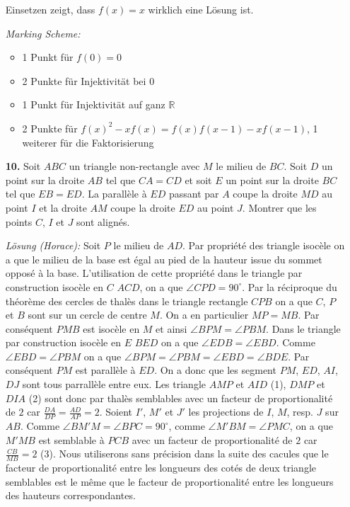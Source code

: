 \documentclass[language=german,style=solution]{smo}
\begin{document}
\begin{enumerate}
Einsetzen zeigt, dass $f(x) = x$ wirklich eine Lösung ist.

\textit{Marking Scheme:}
\begin{itemize}
	\item 1 Punkt für $f(0) = 0$
	\item 2 Punkte für Injektivität bei $0$
	\item 1 Punkt für Injektivität auf ganz $\mathbb{R}$
	\item 2 Punkte für $f(x)^2 - xf(x) = f(x)f(x - 1) - xf(x-1)$, 1 weiterer für die Faktorisierung
\end{itemize}

\newpage

\item[\textbf{10.}] %
Soit $ABC$ un triangle non-rectangle avec $M$ le milieu de $BC$. Soit $D$ un point sur la droite $AB$ tel que $CA=CD$ et soit $E$ un point sur la droite $BC$ tel que $EB=ED$. La parallèle à $ED$ passant par $A$ coupe la droite $MD$ au point $I$ et la droite $AM$ coupe la droite $ED$ au point $J$. Montrer que les points $C$, $I$ et $J$ sont alignés.

\textit{Lösung (Horace):}
Soit $P$ le milieu de $AD$. Par propriété des triangle isocèle on a que le milieu de la base est égal au pied de la hauteur issue du sommet opposé à la base. L'utilisation de cette propriété dans le triangle par construction isocèle en $C$ $ACD$, on a que $\angle CPD=90^{\circ}$. Par la réciproque du théorème des cercles de thalès dans le triangle rectangle $CPB$ on a que $C$, $P$ et $B$ sont sur un cercle de centre $M$. On a en particulier $MP=MB$. Par conséquent $PMB$ est isocèle en $M$ et ainsi $\angle BPM=\angle PBM$. Dans le triangle par construction isocèle en $E$ $BED$ on a que $\angle EDB=\angle EBD$. Comme $\angle EBD=\angle PBM$ on a que $\angle BPM=\angle PBM=\angle EBD=\angle BDE$. Par conséquent $PM$ est parallèle à $ED$. On a donc que les segment $PM$, $ED$, $AI$, $DJ$ sont tous parrallèle entre eux. Les triangle $AMP$ et $AID$ (1), $DMP$ et $DIA$ (2) sont donc par thalès semblables avec un facteur de proportionalité de $2$ car $\frac{DA}{DP}=\frac{AD}{AP}=2$. Soient $I'$, $M'$ et $J'$ les projections de $I$, $M$, resp. $J$ sur $AB$. Comme $\angle BM'M=\angle BPC= 90^{\circ}$, comme $\angle M'BM=\angle PMC$, on a que $M'MB$ est semblable à $PCB$ avec un facteur de proportionalité de $2$ car $\frac{CB}{MB}=2$ (3).
Nous utiliserons sans précision dans la suite des cacules que le facteur de proportionalité entre les longueurs des cotés de deux triangle semblables est le même que le facteur de proportionalité entre les longueurs des hauteurs correspondantes.


\end{enumerate}
\end{document}
